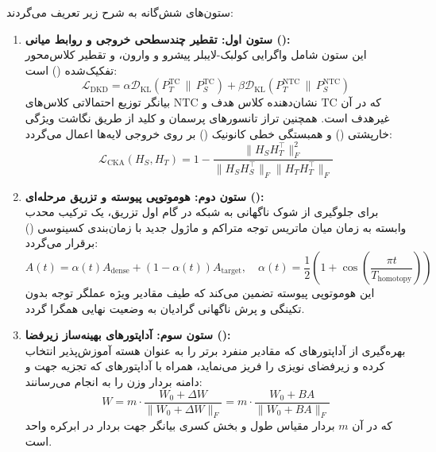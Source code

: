 \documentclass[12pt,a4paper]{report}
\theoremstyle{definition}
\begin{document}
ستون‌های شش‌گانه به شرح زیر تعریف می‌گردند:
\begin{enumerate}
    \item \textbf{ستون اول: تقطیر چندسطحی خروجی و روابط میانی ():} \\
    این ستون شامل واگرایی کولبک-لایبلر پیشرو و وارون، و تقطیر کلاس‌محور تفکیک‌شده () است:
    \begin{equation}
        \mathcal{L}_{\text{DKD}} = \alpha \mathcal{D}_{\text{KL}}(P_T^{\text{TC}} \,\|\, P_S^{\text{TC}}) + \beta \mathcal{D}_{\text{KL}}(P_T^{\text{NTC}} \,\|\, P_S^{\text{NTC}})
    \end{equation}
    که در آن $\text{TC}$ نشان‌دهنده کلاس هدف و $\text{NTC}$ بیانگر توزیع احتمالاتی کلاس‌های غیرهدف است. همچنین تراز تانسورهای پرسمان و کلید از طریق نگاشت ویژگی خارپشتی () و همبستگی خطی کانونیک () بر روی خروجی لایه‌ها اعمال می‌گردد:
    \begin{equation}
        \mathcal{L}_{\text{CKA}}(H_S, H_T) = 1 - \frac{\| H_S H_T^\top \|_F^2}{\| H_S H_S^\top \|_F \| H_T H_T^\top \|_F}
    \end{equation}

    \item \textbf{ستون دوم: هوموتوپی پیوسته و تزریق مرحله‌ای ():} \\
    برای جلوگیری از شوک ناگهانی به شبکه در گام اول تزریق، یک ترکیب محدب وابسته به زمان میان ماتریس توجه متراکم و ماژول جدید با زمان‌بندی کسینوسی () برقرار می‌گردد:
    \begin{equation}
        A(t) = \alpha(t) A_{\text{dense}} + (1 - \alpha(t)) A_{\text{target}}, \quad \alpha(t) = \frac{1}{2}\left(1 + \cos\left(\frac{\pi t}{T_{\text{homotopy}}}\right)\right)
    \end{equation}
    این هوموتوپی پیوسته تضمین می‌کند که طیف مقادیر ویژه عملگر توجه بدون تکینگی و پرش ناگهانی گرادیان به وضعیت نهایی همگرا گردد.

    \item \textbf{ستون سوم: آداپتورهای بهینه‌ساز زیرفضا ():} \\
    بهره‌گیری از آداپتورهای  که مقادیر منفرد برتر را به عنوان هسته آموزش‌پذیر انتخاب کرده و زیرفضای نویزی را فریز می‌نماید، همراه با آداپتورهای  که تجزیه جهت و دامنه بردار وزن را به انجام می‌رسانند:
    \begin{equation}
        W = m \cdot \frac{W_0 + \Delta W}{\|W_0 + \Delta W\|_F} = m \cdot \frac{W_0 + B A}{\|W_0 + B A\|_F}
    \end{equation}
    که در آن $m$ بردار مقیاس طول و بخش کسری بیانگر جهت بردار در ابرکره واحد است.


\end{enumerate}
\end{document}
